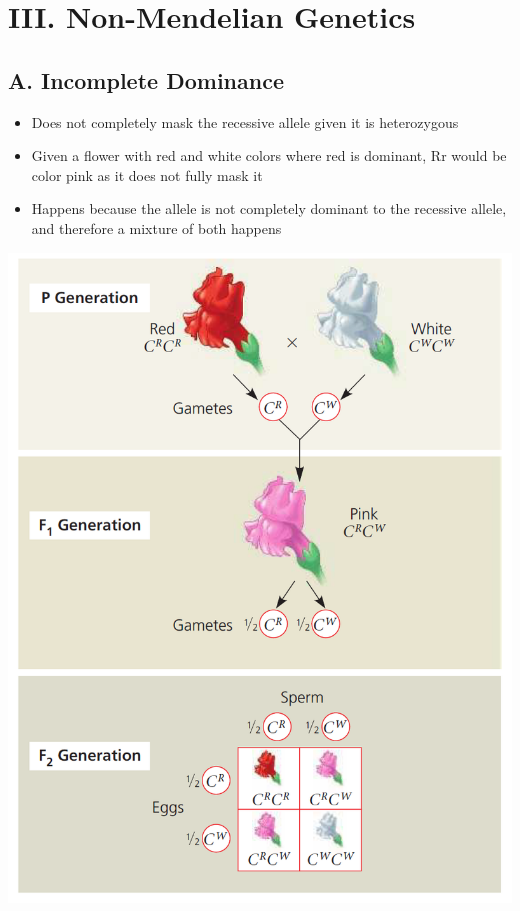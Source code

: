 \documentclass{article}
\begin{document}
\section*{III. Non-Mendelian Genetics}
\subsection*{A. Incomplete Dominance}
\begin{itemize}
    \item Does not completely mask the recessive allele given it is heterozygous
    \item Given a flower with red and white colors where red is dominant, Rr would be color pink as it does not fully mask it
    \item Happens because the allele is not completely dominant to the recessive allele, and therefore a mixture of both happens
\end{itemize}\includegraphics*[scale=0.7]{codominance.png}
\end{document}
